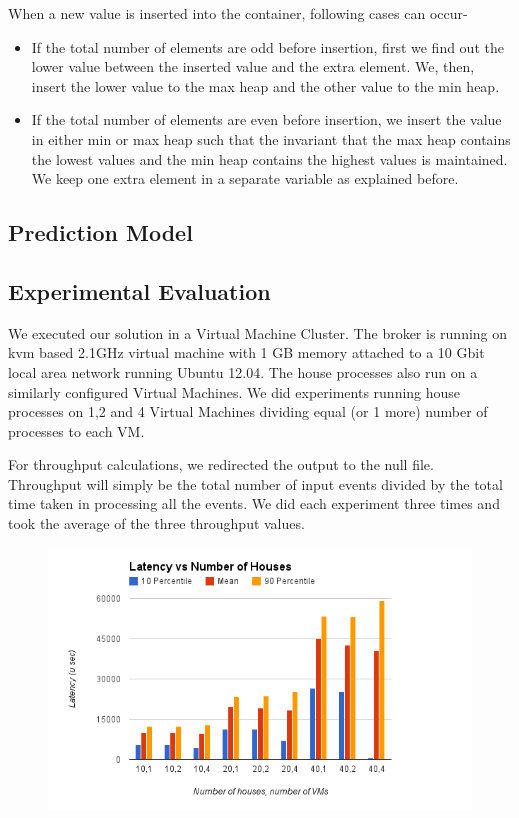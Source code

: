 When a new value is inserted into the container, following cases can occur-
\begin{itemize}
\item If the total number of elements are odd before insertion, first we find out the lower value between the inserted value and the extra element. We, then, insert the lower value to the max heap and the other value to the min heap.
\item If the total number of elements are even before insertion, we insert the value in either min or max heap such that the invariant that the max heap contains the lowest values and the min heap contains the highest values is maintained. We keep one extra element in a separate variable as explained before.
\end{itemize}

\subsection{Prediction Model}

\subsection{Experimental Evaluation}
We executed our solution in a Virtual Machine Cluster. The broker is running on kvm based 2.1GHz virtual machine with 1 GB memory attached to a 10 Gbit local area network running Ubuntu 12.04. The house processes also run on a similarly configured Virtual Machines. We did experiments running house processes on 1,2 and 4 Virtual Machines dividing equal (or 1 more) number of processes to each VM.

For throughput calculations, we redirected the output to the null file. Throughput will simply be the total number of input events divided by the total time taken in processing all the events. We did each experiment three times and took the average of the three throughput values.

\begin{figure}[h]
\begin{center}
	\includegraphics[scale=0.45]{img/q1_latency}
\end{center}
\end{figure}

